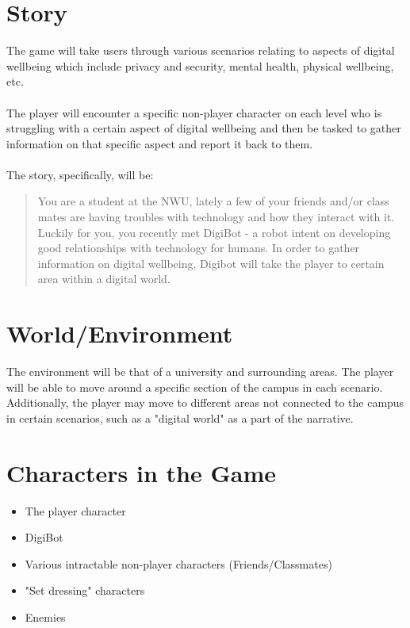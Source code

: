 \documentclass[a4paper]{scrreprt}
\begin{document}
\section{Story}
The game will take users through various scenarios relating to aspects of digital wellbeing which include privacy and security, mental health, physical wellbeing, etc.
\\\\
The player will encounter a specific non-player character on each level who is struggling with a certain aspect of digital wellbeing and then be tasked to gather information on that specific aspect and report it back to them.
\\\\
The story, specifically, will be:
\begin{quote}
You are a student at the NWU, lately a few of your friends and/or class mates are having troubles with technology and how they interact with it. Luckily for you, you recently met DigiBot - a robot intent on developing good relationships with technology for humans. In order to gather information on digital wellbeing, Digibot will take the player to certain area within a digital world.
\end{quote} 


\section{World/Environment}
The environment will be that of a university and surrounding areas. The player will be able to move around a specific section of the campus in each scenario. Additionally, the player may move to different areas not connected to the campus in certain scenarios, such as a "digital world" as a part of the narrative.


\section{Characters in the Game}
\begin{itemize}
\item The player character
\item DigiBot
\item Various intractable non-player characters (Friends/Classmates) 
\item "Set dressing" characters
\item Enemies
\end{itemize}
\end{document}
